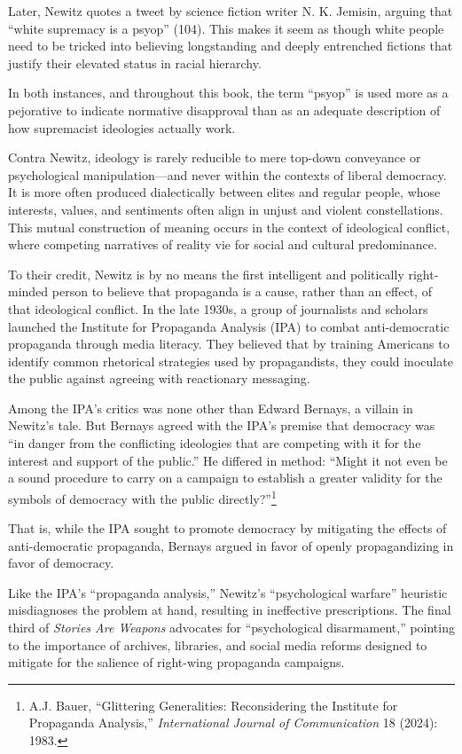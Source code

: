 \documentclass{tufte-handout}
\begin{document}
Later, Newitz quotes a tweet by science fiction writer N. K. Jemisin,
arguing that ``white supremacy is a psyop'' (104). This makes it seem as
though white people need to be tricked into believing longstanding and
deeply entrenched fictions that justify their elevated status in racial
hierarchy.

In both instances, and throughout this book, the term ``psyop'' is used
more as a pejorative to indicate normative disapproval than as an
adequate description of how supremacist ideologies actually work.

Contra Newitz, ideology is rarely reducible to mere top-down conveyance
or psychological manipulation---and never within the contexts of liberal
democracy. It is more often produced dialectically between elites and
regular people, whose interests, values, and sentiments often align in
unjust and violent constellations. This mutual construction of meaning
occurs in the context of ideological conflict, where competing
narratives of reality vie for social and cultural predominance.

To their credit, Newitz is by no means the first intelligent and
politically right-minded person to believe that propaganda is a cause,
rather than an effect, of that ideological conflict. In the late 1930s,
a group of journalists and scholars launched the Institute for
Propaganda Analysis (IPA) to combat anti-democratic propaganda through
media literacy. They believed that by training Americans to identify
common rhetorical strategies used by propagandists, they could inoculate
the public against agreeing with reactionary messaging.

Among the IPA's critics was none other than Edward Bernays, a villain in
Newitz's tale. But Bernays agreed with the IPA's premise that democracy
was ``in danger from the conflicting ideologies that are competing with
it for the interest and support of the public.'' He differed in method:
``Might it not even be a sound procedure to carry on a campaign to
establish a greater validity for the symbols of democracy with the
public directly?''\footnote{A.J. Bauer, ``Glittering Generalities:
  Reconsidering the Institute for Propaganda Analysis,''
  \emph{International Journal of Communication} 18 (2024): 1983.}

\newpage That is, while the IPA sought to promote democracy by mitigating the
effects of anti-democratic propaganda, Bernays argued in favor of openly
propagandizing in favor of democracy.

Like the IPA's ``propaganda analysis,'' Newitz's ``psychological
warfare'' heuristic misdiagnoses the problem at hand, resulting in
ineffective prescriptions. The final third of \emph{Stories Are Weapons}
advocates for ``psychological disarmament,'' pointing to the importance
of archives, libraries, and social media reforms designed to mitigate
for the salience of right-wing propaganda campaigns.
\end{document}
